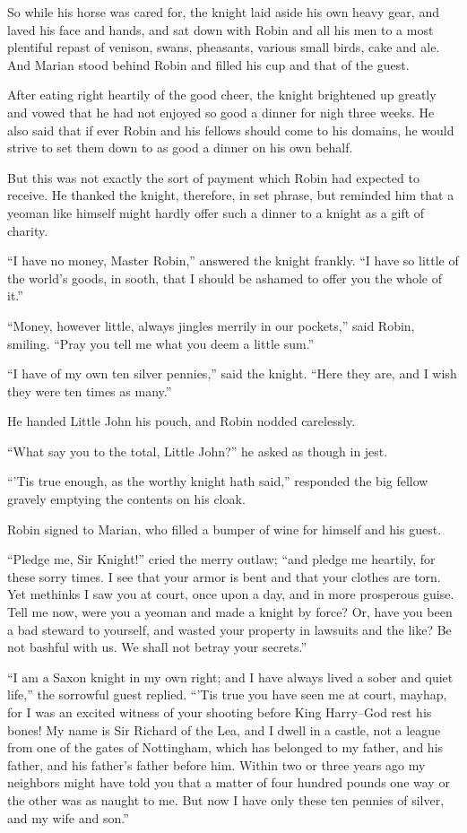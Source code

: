 So while his horse was cared for, the knight laid aside his own heavy
gear, and laved his face and hands, and sat down with Robin and all his
men to a most plentiful repast of venison, swans, pheasants, various
small birds, cake and ale. And Marian stood behind Robin and filled his
cup and that of the guest.

After eating right heartily of the good cheer, the knight brightened up
greatly and vowed that he had not enjoyed so good a dinner for nigh
three weeks. He also said that if ever Robin and his fellows should come
to his domains, he would strive to set them down to as good a dinner on
his own behalf.

But this was not exactly the sort of payment which Robin had expected to
receive. He thanked the knight, therefore, in set phrase, but reminded
him that a yeoman like himself might hardly offer such a dinner to a
knight as a gift of charity.

``I have no money, Master Robin,'' answered the knight frankly. ``I have
so little of the world's goods, in sooth, that I should be ashamed to
offer you the whole of it.''

``Money, however little, always jingles merrily in our pockets,'' said
Robin, smiling. ``Pray you tell me what you deem a little sum.''

``I have of my own ten silver pennies,'' said the knight. ``Here they
are, and I wish they were ten times as many.''

He handed Little John his pouch, and Robin nodded carelessly.

``What say you to the total, Little John?'' he asked as though in jest.

``'Tis true enough, as the worthy knight hath said,'' responded the big
fellow gravely emptying the contents on his cloak.

Robin signed to Marian, who filled a bumper of wine for himself and his
guest.

``Pledge me, Sir Knight!'' cried the merry outlaw; ``and pledge me
heartily, for these sorry times. I see that your armor is bent and that
your clothes are torn. Yet methinks I saw you at court, once upon a day,
and in more prosperous guise. Tell me now, were you a yeoman and made a
knight by force? Or, have you been a bad steward to yourself, and wasted
your property in lawsuits and the like? Be not bashful with us. We shall
not betray your secrets.''

``I am a Saxon knight in my own right; and I have always lived a sober
and quiet life,'' the sorrowful guest replied. ``'Tis true you have seen
me at court, mayhap, for I was an excited witness of your shooting
before King Harry--God rest his bones! My name is Sir Richard of the
Lea, and I dwell in a castle, not a league from one of the gates of
Nottingham, which has belonged to my father, and his father, and his
father's father before him. Within two or three years ago my neighbors
might have told you that a matter of four hundred pounds one way or the
other was as naught to me. But now I have only these ten pennies of
silver, and my wife and son.''

